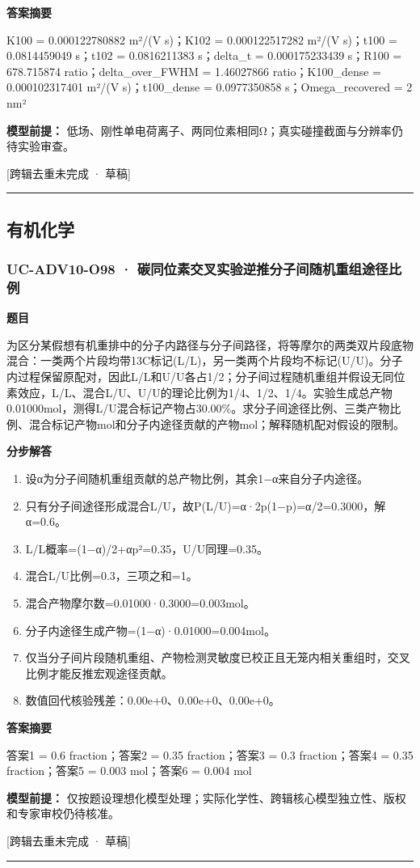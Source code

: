 \documentclass[UTF8,11pt,a4paper]{ctexart}
\begin{document}
\noindent\textbf{答案摘要}\par
K100 = 0.000122780882 m²/(V s)；K102 = 0.000122517282 m²/(V s)；t100 = 0.0814459049 s；t102 = 0.0816211383 s；delta\_t = 0.000175233439 s；R100 = 678.715874 ratio；delta\_over\_FWHM = 1.46027866 ratio；K100\_dense = 0.000102317401 m²/(V s)；t100\_dense = 0.0977350858 s；Omega\_recovered = 2 nm²\par
\noindent\textbf{模型前提：}
低场、刚性单电荷离子、两同位素相同Ω；真实碰撞截面与分辨率仍待实验审查。\par
\noindent\textcolor{red!65!black}{[跨辑去重未完成 · 草稿]} \par
\medskip\hrule\medskip
\subsection*{有机化学}
\subsubsection*{UC-ADV10-O98 · 碳同位素交叉实验逆推分子间随机重组途径比例}
\noindent\textbf{题目}\par
为区分某假想有机重排中的分子内路径与分子间路径，将等摩尔的两类双片段底物混合：一类两个片段均带13C标记(L/L)，另一类两个片段均不标记(U/U)。分子内过程保留原配对，因此L/L和U/U各占1/2；分子间过程随机重组并假设无同位素效应，L/L、混合L/U、U/U的理论比例为1/4、1/2、1/4。实验生成总产物0.01000mol，测得L/U混合标记产物占30.00\%。求分子间途径比例、三类产物比例、混合标记产物mol和分子内途径贡献的产物mol；解释随机配对假设的限制。\par
\medskip\noindent\textbf{分步解答}
\begin{enumerate}
\item 设α为分子间随机重组贡献的总产物比例，其余1−α来自分子内途径。
\item 只有分子间途径形成混合L/U，故P(L/U)=α·2p(1−p)=α/2=0.3000，解α=0.6。
\item L/L概率=(1−α)/2+αp²=0.35，U/U同理=0.35。
\item 混合L/U比例=0.3，三项之和=1。
\item 混合产物摩尔数=0.01000·0.3000=0.003mol。
\item 分子内途径生成产物=(1−α)·0.01000=0.004mol。
\item 仅当分子间片段随机重组、产物检测灵敏度已校正且无笼内相关重组时，交叉比例才能反推宏观途径贡献。
\item 数值回代核验残差：0.00e+0、0.00e+0、0.00e+0。
\end{enumerate}
\noindent\textbf{答案摘要}\par
答案1 = 0.6 fraction；答案2 = 0.35 fraction；答案3 = 0.3 fraction；答案4 = 0.35 fraction；答案5 = 0.003 mol；答案6 = 0.004 mol\par
\noindent\textbf{模型前提：}
仅按题设理想化模型处理；实际化学性、跨辑核心模型独立性、版权和专家审校仍待核准。\par
\noindent\textcolor{red!65!black}{[跨辑去重未完成 · 草稿]} \par
\medskip\hrule\medskip
{}
\end{document}
